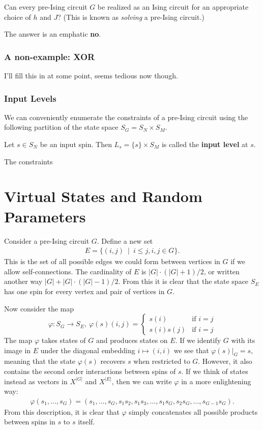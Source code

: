 \documentclass[raggedright, nofonts, notitlepage, openany, debug]{tufte-book}
\begin{document}
\begin{question}
  Can every pre-Ising circuit $G$ be realized as an Ising circuit for an appropriate choice of $h$ and $J$? (This is known as \emph{solving} a pre-Ising circuit.)
\end{question}

The answer is an emphatic \textbf{no}.

\subsection{A non-example: XOR}
I'll fill this in at some point, seems tedious now though.

\subsection{Input Levels}
We can conveniently enumerate the constraints of a pre-Ising circuit using the following partition of the state space $S_G = S_N\times S_M$.
\begin{defn}
  Let $s \in S_N$ be an input spin. Then $L_s = \{s\}\times S_M$ is called the \textbf{input level} at $s$.
\end{defn}
The constraints

\chapter{Virtual States and Random Parameters}
Consider a pre-Ising circuit $G$. Define a new set
\begin{align*}
  E = \{(i,j) ~ \mid ~ i \leq j, i,j \in G\}.
\end{align*}
This is the set of all possible edges we could form between vertices in $G$ if we allow self-connections. The cardinality of $E$ is $|G|\cdot(|G|+1)/2$, or written another way $|G| + |G|\cdot(|G|-1)/2$. From this it is clear that the state space $S_E$ has one spin for every vertex and pair of vertices in $G$. 

Now consider the map
\begin{equation}\label{eqn:virtual-map}
  \varphi:S_G \to S_E, ~\varphi(s)(i,j) = 
  \begin{cases}
    s(i) & \text{if } i = j \\
    s(i)s(j) & \text{if } i = j
  \end{cases}
\end{equation}
The map $\varphi$ takes states of $G$ and produces states on $E$. If we identify $G$ with its image in $E$ under the diagonal embedding $i \mapsto (i,i)$ we see that $\varphi(s)|_{G} = s$, meaning that the state $\varphi(s)$ recovers $s$ when restricted to $G$. However, it also contains the second order interactions between spins of $s$. If we think of states instead as vectors in $X^{|G|}$ and $X^{|E|}$, then we can write $\varphi$ in a more enlightening way:
\begin{align*}
\varphi(s_1,...,s_{G}) = (s_1,...,s_G,s_1s_2,s_1s_3,...,s_1s_G,s_2s_G,...,s_{G-1}s_{G}).
\end{align*}
From this description, it is clear that $\varphi$ simply concatenates all possible products between spins in $s$ to $s$ itself. 
\end{document}
